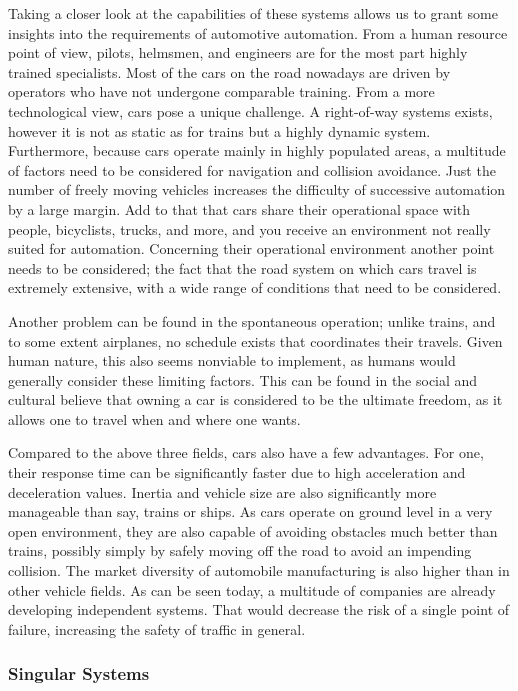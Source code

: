\documentclass{acm_proc_article-sp}
\begin{document}
Taking a closer look at the capabilities of these systems allows us to grant some insights into the requirements of automotive automation.
From a human resource point of view, pilots, helmsmen, and engineers are for the most part highly trained specialists.
Most of the cars on the road nowadays are driven by operators who have not undergone comparable training.
From a more technological view, cars pose a unique challenge.
A right-of-way systems exists, however it is not as static as for trains but a highly dynamic system.
Furthermore, because cars operate mainly in highly populated areas, a multitude of factors need to be considered for navigation and collision avoidance.
Just the number of freely moving vehicles increases the difficulty of successive automation by a large margin.
Add to that that cars share their operational space with people, bicyclists, trucks, and more, and you receive an environment not really suited for automation.
Concerning their operational environment another point needs to be considered; the fact that the road system on which cars travel is extremely extensive, with a wide range of conditions that need to be considered.

Another problem can be found in the spontaneous operation; unlike trains, and to some extent airplanes, no schedule exists that coordinates their travels.
Given human nature, this also seems nonviable to implement, as humans would generally consider these limiting factors.
This can be found in the social and cultural believe that owning a car is considered to be the ultimate freedom, as it allows one to travel when and where one wants.

Compared to the above three fields, cars also have a few advantages.
For one, their response time can be significantly faster due to high acceleration and deceleration values.
Inertia and vehicle size are also significantly more manageable than say, trains or ships.
As cars operate on ground level in a very open environment, they are also capable of avoiding obstacles much better than trains, possibly simply by safely moving off the road to avoid an impending collision.
The market diversity of automobile manufacturing is also higher than in other vehicle fields.
As can be seen today, a multitude of companies are already developing independent systems.
That would decrease the risk of a single point of failure, increasing the safety of traffic in general.

\subsubsection{Singular Systems}
\label{singular_systems}
\end{document}
